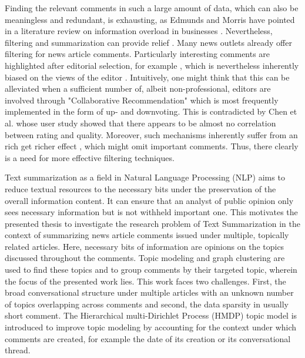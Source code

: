 Finding the relevant comments in such a large amount of data, which can also be meaningless and redundant, is exhausting, as Edmunds and Morris have pointed in a literature review on information overload in businesses \cite{Edmunds2000ThePO}. Nevertheless, filtering and summarization can provide relief \cite{Edmunds2000ThePO}. Many news outlets already offer filtering for news article comments. Particularly interesting comments are highlighted after editorial selection, for example \cite{DBLP:conf/icwsm/KhabiriCH11}, which is nevertheless inherently biased on the views of the editor \cite{DBLP:conf/icwsm/KhabiriCH11}. Intuitively, one might think that this can be alleviated when a sufficient number of, albeit non-professional, editors are involved through "Collaborative Recommendation" which is most frequently implemented in the form of up- and downvoting. This is contradicted by Chen et al. \cite{DBLP:conf/kdd/ChenGTY11} whose user study showed that there appears to be almost no correlation between rating and quality. Moreover, such mechanisms inherently suffer from an rich get richer effect \cite{DBLP:conf/cikm/MaSYC12}, which might omit important comments. Thus, there clearly is a need for more effective filtering techniques. \par
Text summarization as a field in Natural Language Processing (NLP) aims to reduce textual resources to the necessary bits under the preservation of the overall information content. It can ensure that an analyst of public opinion only sees necessary information but is not withheld important one.
This motivates the presented thesis to investigate the research problem of Text Summarization in the context of summarizing news article comments issued under multiple, topically related articles. Here, necessary bits of information are opinions on the topics discussed throughout the comments.
Topic modeling and graph clustering are used to find these topics and to group comments by their targeted topic, wherein the focus of the presented work lies. This work faces two challenges. First, the broad conversational structure under multiple articles with an unknown number of topics overlapping across comments and second, the data sparsity in usually short comment. The Hierarchical multi-Dirichlet Process (HMDP) topic model is introduced to improve topic modeling by accounting for the context under which comments are created, for example the date of its creation or its conversational thread.

